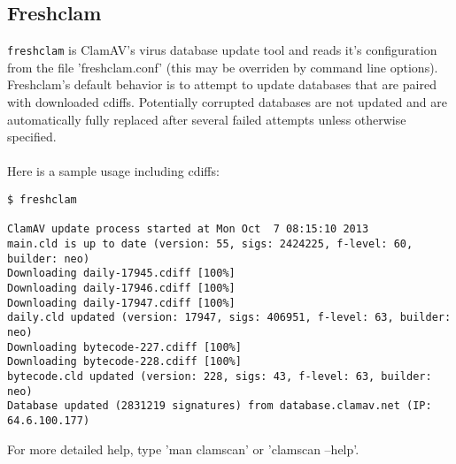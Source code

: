\documentclass[a4paper,titlepage,12pt]{article}
\begin{document}
    \subsection{Freshclam}\label{sec:freshclam}
    \verb+freshclam+ is ClamAV's virus database update tool and reads it's
    configuration from the file 'freshclam.conf' (this may be
    overriden by command line options). Freshclam's default behavior is to
    attempt to update databases that are paired with downloaded cdiffs.
    Potentially corrupted databases are not updated and are automatically
    fully replaced after several failed attempts unless otherwise specified.
    \\\\
    Here is a sample usage including cdiffs:
{\footnotesize
    \begin{verbatim}
$ freshclam

ClamAV update process started at Mon Oct  7 08:15:10 2013
main.cld is up to date (version: 55, sigs: 2424225, f-level: 60, builder: neo)
Downloading daily-17945.cdiff [100%]
Downloading daily-17946.cdiff [100%]
Downloading daily-17947.cdiff [100%]
daily.cld updated (version: 17947, sigs: 406951, f-level: 63, builder: neo)
Downloading bytecode-227.cdiff [100%]
Downloading bytecode-228.cdiff [100%]
bytecode.cld updated (version: 228, sigs: 43, f-level: 63, builder: neo)
Database updated (2831219 signatures) from database.clamav.net (IP: 64.6.100.177)
    \end{verbatim}
}
    For more detailed help, type 'man clamscan' or 'clamscan --help'.
\end{document}
